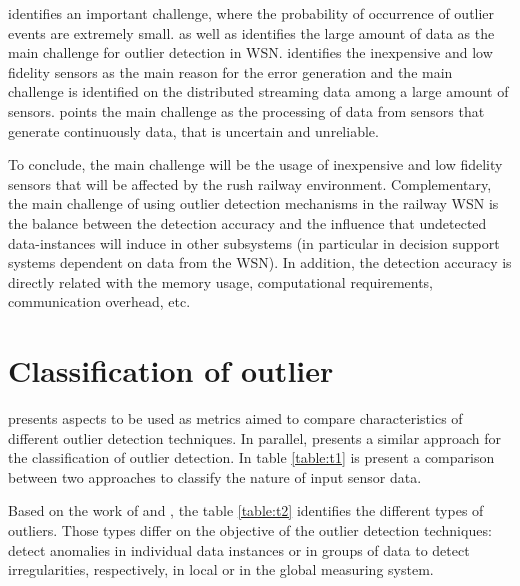 \cite{class:branch:2006} identifies an important challenge, where the probability of occurrence of outlier events are extremely small. \cite{nn:abid:2016} as well as \cite{stat:sheng:2007} identifies the large amount of data as the main challenge for outlier detection in WSN. \cite{nn:zhuang:2006} identifies the inexpensive and low fidelity sensors as the main reason for the error generation and the main challenge is identified on the distributed streaming data among a large amount of sensors. \cite{stat:ghorbel:2015} points the main challenge as the processing of data from sensors that generate continuously data, that is uncertain and unreliable. 

To conclude, the main challenge will be the usage of inexpensive and low fidelity sensors that will be affected by the rush railway environment. Complementary, the main challenge of using outlier detection mechanisms in the railway WSN is the balance between the detection accuracy and the influence that undetected data-instances will induce in other subsystems (in particular in decision support systems dependent on data from the WSN). In addition, the detection accuracy is directly related with the memory usage, computational requirements, communication overhead, etc. 


\newpage

\section{Classification of outlier}
\label{sec:classint}
\cite{gen:zhang:2010} presents aspects to be used as metrics  aimed to compare characteristics of different outlier detection techniques. In parallel, \cite{gen:chandola:2009} presents a similar approach for the classification of outlier detection. 
In table \ref{table:t1} is present a comparison between two approaches to classify the nature of input sensor data.

	

	

Based on the work of \cite{gen:zhang:2010} and \cite{gen:chandola:2009}, the table \ref{table:t2} identifies the different types of outliers. 
Those types differ on the objective of the outlier detection techniques: detect anomalies in individual data instances or in groups of data to detect irregularities, respectively, in local or in the global measuring system.



\newpage


